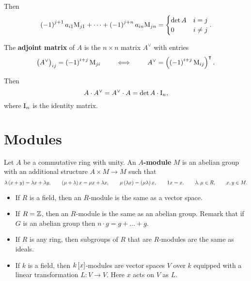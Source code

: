 \begin{proposition}
Then
$$ \br{-1}^{j + 1}a_{i1}\M_{j1} + \dots + \br{-1}^{j + n}a_{in}\M_{jn} =
\begin{cases}
\det A & i = j \\
0 & i \ne j
\end{cases}.
$$
\end{proposition}

\begin{definition}
The \textbf{adjoint matrix} of $ A $ is the $ n \times n $ matrix $ A^\vee $ with entries
$$ \br{A^\vee}_{ij} = \br{-1}^{i + j}\M_{ji} \qquad \iff \qquad A^\vee = \br{\br{-1}^{i + j}\M_{ij}}^\intercal. $$
\end{definition}

\begin{theorem}
\label{thm:8.5}
Then
$$ A \cdot A^\vee = A^\vee \cdot A = \det A \cdot \mathrm{I}_n, $$
where $ \mathrm{I}_n $ is the identity matrix.
\end{theorem}

\section{Modules}

\begin{definition}
Let $ A $ be a commutative ring with unity. An \textbf{$ A $-module} $ M $ is an abelian group with an additional structure $ A \times M \to M $ such that
$$ \lambda\br{x + y} = \lambda x + \lambda y, \qquad \br{\mu + \lambda}x = \mu x + \lambda x, \qquad \mu\br{\lambda x} = \br{\mu\lambda}x, \qquad 1x = x, \qquad \lambda, \mu \in R, \qquad x, y \in M. $$
\end{definition}

\begin{example}
\hfill
\begin{itemize}
\item If $ R $ is a field, then an $ R $-module is the same as a vector space.
\item If $ R = \mathbb{Z} $, then an $ R $-module is the same as an abelian group. Remark that if $ G $ is an abelian group then $ n \cdot g = g + \dots + g $.
\item If $ R $ is any ring, then subgroups of $ R $ that are $ R $-modules are the same as ideals.
\item If $ k $ is a field, then $ k\sbr{x} $-modules are vector spaces $ V $ over $ k $ equipped with a linear transformation $ L : V \to V $. Here $ x $ acts on $ V $ as $ L $.
\end{itemize}
\end{example}

